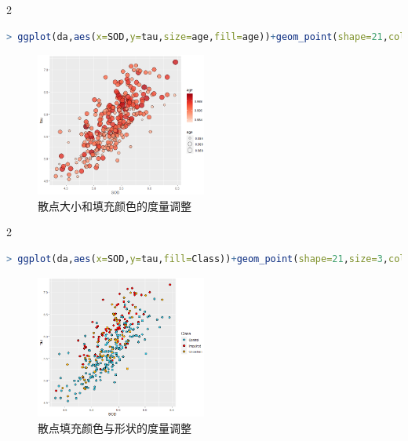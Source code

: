 \documentclass[11pt,a4paper,oneside]{book}
\begin{document}
\hspace{\fill}

\hspace{\fill}
\begin{multicols}{2}
\begin{lstlisting}[language=r]
> ggplot(da,aes(x=SOD,y=tau,size=age,fill=age))+geom_point(shape=21,color="black",stroke=0.25,alpha=0.8)+scale_size(range = c(1,8))+scale_fill_distiller(palette = "Reds",direction = 0)
\end{lstlisting}
\begin{figure}[H]
	\centering
	\includegraphics[width=0.5\textwidth]{screenshot022}
	\caption{散点大小和填充颜色的度量调整}
	\label{fig:screenshot022}
\end{figure}
\end{multicols}
\begin{multicols}{2}
\begin{lstlisting}[language=r]
> ggplot(da,aes(x=SOD,y=tau,fill=Class))+geom_point(shape=21,size=3,color="black",stroke=0.25)+scale_fill_manual(values = c("#36BED9","#FF0000","#FBAD01"))+scale_shape_manual(values = c(21,22,23))
\end{lstlisting}
\begin{figure}[H]
	\centering
	\includegraphics[width=0.5\textwidth]{screenshot023}
	\caption{散点填充颜色与形状的度量调整}
	\label{fig:screenshot023}
\end{figure}
\end{multicols}
\end{document}
